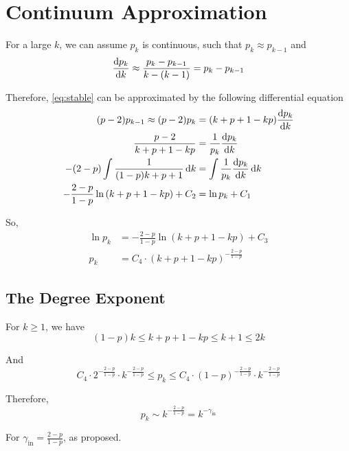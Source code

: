 \section{Continuum Approximation}

For a large $k$, we can assume $p_k$ is continuous, such that $p_k \approx p_{k-1}$ and \[
    \dv{p_k}{k} \approx \frac{p_k - p_{k-1}}{k - (k-1)} = p_k - p_{k-1}
\]

Therefore, \cref{eq:stable} can be approximated by the following differential equation
\begin{align*}
    (p - 2) p_{k-1} \approx (p - 2) p_k &= (k + p + 1 - k p) \dv{p_k}{k} \\
        \frac{p - 2}{k + p + 1 - k p} &= \frac{1}{p_k} \dv{p_k}{k} \\
        - (2 - p) \int \frac{1}{(1 - p) k + p + 1} \dd{k} &= \int \frac{1}{p_k} \dv{p_k}{k} \dd{k} \\
        - \frac{2 - p}{1 - p} \ln\left(k + p + 1 - k p\right) + C_2 &= \ln p_k + C_1
\end{align*}

So,
\begin{align*}
    \ln p_k &= - \frac{2 - p}{1 - p} \ln\left(k + p + 1 - k p\right) + C_3 \\
    p_k &= C_4 \cdot \left(k + p + 1 - k p\right)^{-\frac{2 - p}{1 - p}}
\end{align*}

\subsection{The Degree Exponent}

    For $k \geq 1$, we have \[
        (1 - p) k \leq k + p + 1 - k p \leq k + 1 \leq 2 k
    \]

    And \[
        C_4 \cdot 2^{-\frac{2 - p}{1 - p}} \cdot k^{-\frac{2 - p}{1 - p}} \leq p_k \leq C_4 \cdot (1 - p)^{-\frac{2 - p}{1 - p}} \cdot k^{-\frac{2 - p}{1 - p}}
    \]

    Therefore,
    \[
        p_k \sim k^{-\frac{2 - p}{1 - p}} = k^{-\gamma_\text{in}}
    \]

    For $\gamma_\text{in} = \frac{2 - p}{1 - p}$, as proposed.
